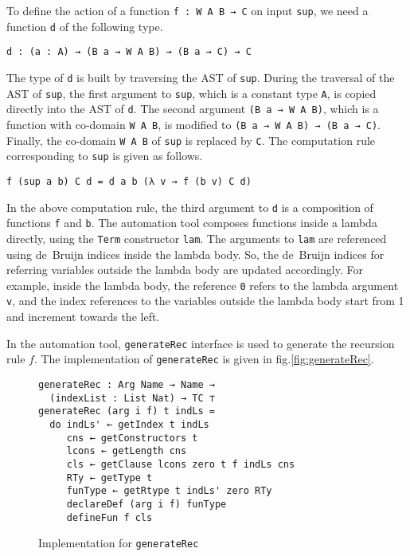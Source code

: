 \documentclass[sigplan,10pt]{acmart}
\begin{document}
To define the action of a function {\tt f : W A B → C} on input {\tt sup}, we need a function {\tt d} of the following type.
\begin{center}
\begingroup
\begin{BVerbatim}
d : (a : A) → (B a → W A B) → (B a → C) → C
\end{BVerbatim}
\endgroup
\end{center}

The type of {\tt d} is built by traversing the AST of {\tt sup}. During the traversal of the AST of {\tt sup}, the first argument to {\tt sup}, which is a constant type {\tt A}, is copied directly into the AST of {\tt d}. The second argument {\tt (B a  → W A B)}, which is a function with co-domain {\tt W A B}, is modified to {\tt (B a  → W A B) → (B a → C)}. Finally, the co-domain {\tt W A B} of {\tt sup} is replaced by {\tt C}. The computation rule corresponding to {\tt sup} is given as follows.
\begin{center}
\begingroup
\begin{BVerbatim}
f (sup a b) C d = d a b (λ v → f (b v) C d)
\end{BVerbatim}
\endgroup
\end{center}

In the above computation rule, the third argument to {\tt d} is a composition of functions {\tt f} and {\tt b}. The automation tool composes functions inside a lambda directly, using the \texttt{Term} constructor {\tt lam}. The arguments to {\tt lam} are referenced using de~Bruijn indices inside the lambda body. So, the de~Bruijn indices for referring variables outside the lambda body are updated accordingly. For example, inside the lambda body, the reference {\tt 0} refers to the lambda argument {\tt v}, and the index references to the variables outside the lambda body start from 1 and increment towards the left.

In the automation tool, {\tt generateRec} interface is used to generate the recursion rule $f$. The implementation of {\tt generateRec} is given in fig.\eqref{fig:generateRec}.

\begin{figure}
\begin{center}
\begingroup
\fontsize{7pt}{9pt}\selectfont
\begin{Verbatim}
generateRec : Arg Name → Name → 
  (indexList : List Nat) → TC ⊤
generateRec (arg i f) t indLs =
  do indLs' ← getIndex t indLs
     cns ← getConstructors t
     lcons ← getLength cns
     cls ← getClause lcons zero t f indLs cns
     RTy ← getType t
     funType ← getRtype t indLs' zero RTy
     declareDef (arg i f) funType
     defineFun f cls
\end{Verbatim}
\endgroup
\end{center}
\caption{Implementation for {\tt generateRec}}
\label{fig:generateRec}
\end{figure}
\normalsize
\end{document}
